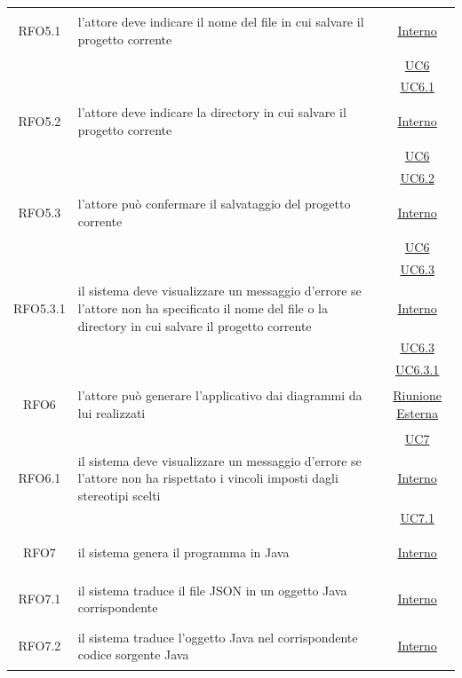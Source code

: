 \begin{longtable}{|c|>{\centering}m{7cm}|c|}
\hypertarget{RFO5.1}{RFO5.1} & l'attore deve indicare il nome del file in cui salvare il progetto corrente&  \hyperlink{Interno}{Interno}\\
& & \hyperref[UC6]{UC6}\\
& & \hyperref[UC6.1]{UC6.1}\\ \hline

\hypertarget{RFO5.2}{RFO5.2} & l'attore deve indicare la directory in cui salvare il progetto corrente&  \hyperlink{Interno}{Interno}\\
& & \hyperref[UC6]{UC6}\\
& & \hyperref[UC6.2]{UC6.2}\\ \hline

\hypertarget{RFO5.3}{RFO5.3} & l'attore può confermare il salvataggio del progetto corrente &  \hyperlink{Interno}{Interno}\\
& & \hyperref[UC6]{UC6}\\
& & \hyperref[UC6.3]{UC6.3}\\ \hline

\hypertarget{RFO5.3.1}{RFO5.3.1} & il sistema deve visualizzare un messaggio d'errore se l'attore non ha specificato il nome del file o la directory in cui salvare il progetto corrente &  \hyperlink{Interno}{Interno}\\
& & \hyperref[UC6.3]{UC6.3}\\
& & \hyperref[UC6.3.1]{UC6.3.1}\\ \hline

\hypertarget{RFO6}{RFO6} & l'attore può generare l'applicativo dai diagrammi da lui realizzati & \hyperlink{Riunione Esterna}{Riunione Esterna}\\
& & \hyperref[UC7]{UC7}\\ \hline

\hypertarget{RFO6.1}{RFO6.1} & il sistema deve visualizzare un messaggio d'errore se l'attore non ha rispettato i vincoli imposti dagli stereotipi scelti& \hyperlink{Interno}{Interno}\\
& & \hyperref[UC7.1]{UC7.1}\\ \hline

\hypertarget{RFO7}{RFO7} & il sistema genera il programma in Java & \hyperlink{Interno}{Interno}\\ \hline

\hypertarget{RFO7.1}{RFO7.1} & il sistema traduce il file JSON in un oggetto Java corrispondente& \hyperlink{Interno}{Interno}\\ \hline

\hypertarget{RFO7.2}{RFO7.2} & il sistema traduce l'oggetto Java nel corrispondente codice sorgente Java & \hyperlink{Interno}{Interno}\\ \hline


\end{longtable}
